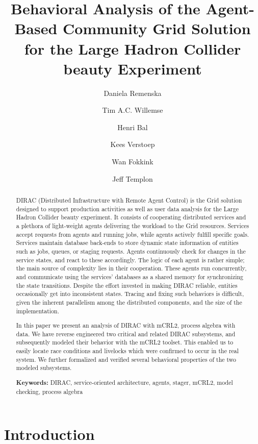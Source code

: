 \documentclass{IEEEtran}
\begin{document}
\title{Behavioral Analysis of the Agent-Based Community Grid Solution for the Large Hadron Collider beauty Experiment}
\author{Daniela Remenska \and Tim A.C. Willemse \and Henri Bal \and 
Kees Verstoep \and Wan Fokkink \and Jeff Templon}

\maketitle

\begin{abstract}
DIRAC (Distributed Infrastructure with Remote Agent Control) is the Grid
solution designed to support production activities as well as user data
analysis for the Large Hadron Collider beauty experiment. It consists of
cooperating distributed services and a plethora of light-weight agents
delivering the workload to the Grid resources.  Services accept requests
from agents and running jobs, while agents actively fulfill specific
goals. Services maintain database back-ends to store dynamic state
information of entities such as jobs, queues, or staging requests. Agents
continuously check for changes in the service states, and react to these
accordingly. The logic of each agent is rather simple; the main source
of complexity lies in their cooperation. These agents run concurrently,
and communicate using the services' databases as a shared memory for
synchronizing the state transitions. Despite the effort invested in
making DIRAC reliable, entities occasionally get into inconsistent
states. Tracing and fixing such behaviors is difficult, given the
inherent parallelism among the distributed components, and the size of
the implementation.

In this paper we present an analysis of DIRAC with mCRL2, process
algebra with data. We have reverse engineered two critical and related
DIRAC subsystems, and subsequently modeled their behavior with the mCRL2
toolset. This enabled us to easily locate race conditions and livelocks
which were confirmed to occur in the real system. We further formalized
and verified several behavioral properties of the two modeled subsystems.

\textbf{Keywords:} DIRAC, service-oriented architecture, agents, stager,
mCRL2,  model checking,  process algebra

\end{abstract}


\section{Introduction}
\end{document}
